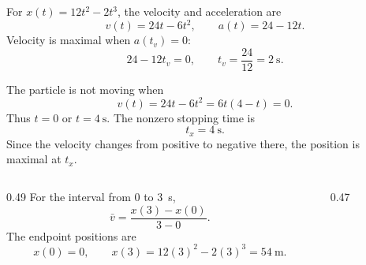 \begin{solutionframe}
  For $x(t)=12t^2-2t^3$, the velocity and acceleration are
  \[
    v(t)=24t-6t^2,
    \qquad
    a(t)=24-12t.
  \]
  Velocity is maximal when $a(t_v)=0$:
  \[
    24-12t_v=0,
    \qquad
    t_v=\frac{24}{12}=\SI{2}{\second}.
  \]
\end{solutionframe}

\begin{solutionframe}
  \footnotesize
  The particle is not moving when
  \[
    v(t)=24t-6t^2=6t(4-t)=0.
  \]
  Thus $t=0$ or $t=\SI{4}{\second}$. The nonzero stopping time is
  \[
    t_x=\SI{4}{\second}.
  \]
  Since the velocity changes from positive to negative there, the position is
  maximal at $t_x$.
\end{solutionframe}

\begin{solutionframe}
  \begin{columns}[T,onlytextwidth]
    \begin{column}{0.49\textwidth}
      For the interval from $0$ to \SI{3}{\second},
      \[
        \bar v=\frac{x(3)-x(0)}{3-0}.
      \]
      The endpoint positions are
      \[
        x(0)=0,
        \qquad
        x(3)=12(3)^2-2(3)^3=\SI{54}{\metre}.
      \]
    \end{column}
    \begin{column}{0.47\textwidth}
      \centering
      \resizebox{\textwidth}{!}{}
    \end{column}
  \end{columns}
\end{solutionframe}


